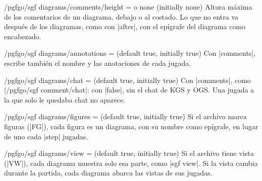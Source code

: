 \begin{key}{/pgfgo/sgf diagrams/comments/height =  o none (initially none)}
	Altura máxima de los comentarios de un diagrama, debajo o al costado. Lo que no entra va después de los diagramas, como con |after|, con el epígrafe del diagrama como encabezado.

	\begin{codeexample}
	\end{codeexample}
\end{key}

\begin{key}{/pgfgo/sgf diagrams/annotations =  (default true, initially true)}
	Con |comments|, escribe también el nombre y las anotaciones de cada jugada.

	\begin{codeexample}
	\end{codeexample}

\end{key}

\begin{key}{/pgfgo/sgf diagrams/chat =  (default true, initially true)}
	Con |comments|, como |/pgfgo/sgf comment/chat|: con |false|, sin el chat de KGS y OGS. Una jugada a la que solo le quedaba chat no aparece.
\end{key}

\begin{key}{/pgfgo/sgf diagrams/figures =  (default true, initially true)}
	Si el archivo marca figuras (|FG|), cada figura es un diagrama, con su nombre como epígrafe, en lugar de uno cada |step| jugadas.
\end{key}

\begin{key}{/pgfgo/sgf diagrams/view =  (default true, initially true)}
	Si el archivo tiene vista (|VW|), cada diagrama muestra solo esa parte, como |sgf view|. Si la vista cambia durante la partida, cada diagrama abarca las vistas de sus jugadas.
\end{key}

